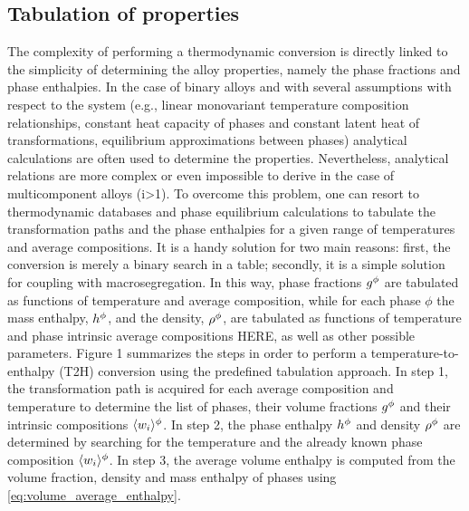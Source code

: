 \subsection{Tabulation of properties}
The complexity of performing a thermodynamic conversion is directly linked to the simplicity of determining the alloy properties, namely the 
phase fractions and phase enthalpies. In the case of binary alloys and with several assumptions with respect to the system (e.g., linear monovariant 
temperature composition relationships, constant heat capacity of phases and constant latent heat of transformations, equilibrium approximations between 
phases) analytical calculations are often used to determine the properties. Nevertheless, analytical relations are more complex or even impossible to 
derive in the case of multicomponent alloys (i>1). To overcome this problem, one can resort to thermodynamic databases and phase equilibrium calculations 
to tabulate the transformation paths and the phase enthalpies for a given range of temperatures and average compositions. It is a handy solution for two 
main reasons: first, the conversion is merely a binary search in a table; secondly, it is a simple solution for coupling with macrosegregation. In this way, 
phase fractions $g^{\phi} $ are tabulated as functions of temperature and average composition, while for each phase $\phi$ the mass enthalpy, $h^{\phi} $, and 
the density, $\rho^{\phi} $, are tabulated as functions of temperature and phase intrinsic average compositions HERE, as well as other possible parameters. 
Figure 1 summarizes the steps in order to perform a temperature-to-enthalpy (T2H) conversion using the predefined tabulation approach. In step 1, the 
transformation path is acquired for each average composition and temperature to determine the list of phases, their volume fractions $g^{\phi} $ and their intrinsic 
compositions $\langle w_i \rangle^{\phi}$. In step 2, the phase enthalpy $h^{\phi} $  and density $\rho^{\phi} $ are determined by searching for the temperature 
and the already known phase composition $\langle w_i \rangle^{\phi}$. In step 3, the average volume enthalpy is computed from the volume fraction, density and mass enthalpy 
of phases using \eqref{eq:volume_average_enthalpy}.


